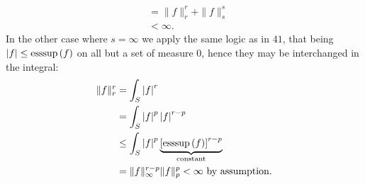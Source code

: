 \documentclass[a4paper]{article}
\begin{document}
\begin{problem}[42]
\begin{enumerate}
\begin{align*}
			&= \|f\|_{r}^{r} + \|f\|_{s}^{s} \\
			&< \infty
		.\end{align*}
		In the other case where \(s = \infty\) we apply the same logic as in \(41\), that being \(\left| f \right| \le \operatorname{esssup} \left( f \right) \) on all but a set of measure \(0\), hence they may be interchanged in the integral:
		\begin{align*}
			\|f\|_{r}^{r} &= \int_{S} \left| f \right| ^{r} \\
				      &= \int_{S} \left| f \right| ^{p} \left| f \right| ^{r-p} \\
				      &\le \int_{S} \left| f \right| ^{p} \underbrace{\left[\operatorname{esssup}\left( f \right) \right]^{r-p}}_{\text{constant}}
				\\ &= \|f\|_{\infty}^{r-p} \|f\|_{p}^{p} < \infty \text{ by assumption}
		.\end{align*}
\end{enumerate}
\end{problem}
\newpage
\end{document}
